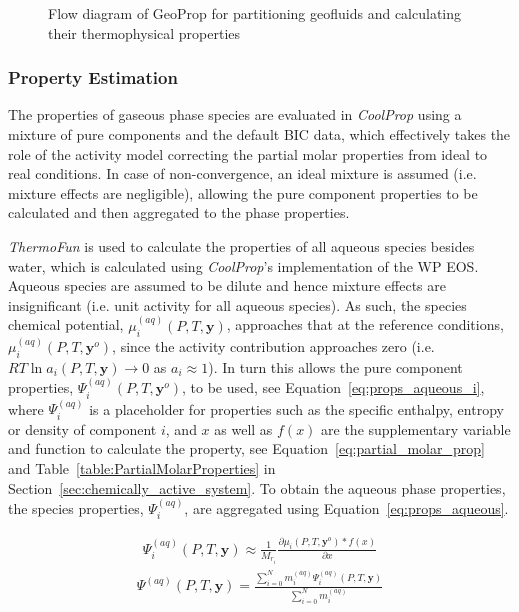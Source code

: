     \begin{figure}[H]
        \centering
        \resizebox{.75\linewidth}{!}{}
        \caption{Flow diagram of GeoProp for partitioning geofluids and calculating their thermophysical properties}
        \label{fig:geoprop_v1}
    \end{figure}

    \subsubsection{Property Estimation}
        The properties of gaseous phase species are evaluated in \emph{CoolProp} using a mixture of pure components and the default \ac{BIC} data, which effectively takes the role of the activity model correcting the partial molar properties from ideal to real conditions. In case of non-convergence, an ideal mixture is assumed (i.e. mixture effects are negligible), allowing the pure component properties to be calculated and then aggregated to the phase properties.

        \emph{ThermoFun} is used to calculate the properties of all aqueous species besides water, which is calculated using \emph{CoolProp}’s implementation of the \ac{WP} \ac{EOS}. Aqueous species are assumed to be dilute and hence mixture effects are insignificant (i.e. unit activity for all aqueous species). As such, the species chemical potential, \(\mu_i^{(aq)} (P,T, \mathbf{y})\), approaches that at the reference conditions, \(\mu_i^{(aq)} (P,T, \mathbf{y}^o)\), since the activity contribution approaches zero (i.e. \(RT\ln a_i (P, T, \mathbf{y})\rightarrow 0\) as \(a_i\approx1\)). In turn this allows the pure component properties, \(\Psi_i^{(aq)}(P, T, \mathbf{y}^o)\), to be used, see Equation~\ref{eq:props_aqueous_i}, where \(\Psi_i^{(aq)}\) is a placeholder for properties such as the specific enthalpy, entropy or density of component \(i\), and \(x\) as well as \(f(x)\) are the supplementary variable and function to calculate the property, see Equation~\ref{eq:partial_molar_prop} and Table~\ref{table:PartialMolarProperties} in  Section~\ref{sec:chemically_active_system}. To obtain the aqueous phase properties, the species properties, \(\Psi_i^{(aq)}\), are aggregated using Equation~\ref{eq:props_aqueous}.

        \begin{align}
            \Psi_i^{(aq)} (P, T, \mathbf{y}) \approx \frac{1}{M_{r_i}} \frac{\partial \mu_i (P, T, \mathbf{y}^o)*f(x)}{\partial x} \label{eq:props_aqueous_i}
        \end{align}
        \begin{align}
            \Psi^{(aq)} (P, T, \mathbf{y}) = \frac{\sum_{i=0}^N m_i^{(aq)} \Psi_i^{(aq)} (P, T, \mathbf{y})}{\sum_{i=0}^N m_i^{(aq)}} \label{eq:props_aqueous}
        \end{align}
    
